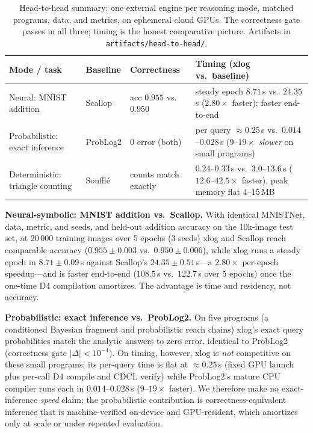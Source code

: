 \begin{table}[htbp]
  \centering
  \caption{Head-to-head summary: one external engine per reasoning mode, matched programs, data, and metrics, on ephemeral cloud GPUs. The correctness gate passes in all three; timing is the honest comparative picture. Artifacts in \texttt{artifacts/head-to-head/}.}
  \label{tab:h2h}
  \small
  \begin{tabularx}{\linewidth}{@{}l l l L@{}}
    \toprule
    \textbf{Mode / task} & \textbf{Baseline} & \textbf{Correctness} & \textbf{Timing (xlog vs.\ baseline)} \\
    \midrule
    Neural: MNIST addition           & Scallop  & acc $0.955$ vs.\ $0.950$ & steady epoch $8.71$\,s vs.\ $24.35$\,s ($\mathbf{2.80\times}$ faster); faster end-to-end \\
    Probabilistic: exact inference   & ProbLog2 & $0$ error (both) & per query ${\approx}0.25$\,s vs.\ $0.014$--$0.028$\,s ($9$--$19\times$ \emph{slower} on small programs) \\
    Deterministic: triangle counting & Soufflé  & counts match exactly & $0.24$--$0.33$\,s vs.\ $3.0$--$13.6$\,s ($\mathbf{12.6}$--$\mathbf{42.5\times}$ faster), peak memory flat $4$--$15$\,MB \\
    \bottomrule
  \end{tabularx}
\end{table}

\textbf{Neural-symbolic: MNIST addition vs.\ Scallop.} With identical MNISTNet, data, metric, and seeds, and held-out addition accuracy on the 10k-image test set, at 20\,000 training images over 5 epochs (3 seeds) xlog and Scallop reach comparable accuracy ($0.955 \pm 0.003$ vs.\ $0.950 \pm 0.006$), while xlog runs a steady epoch in $8.71 \pm 0.09$\,s against Scallop's $24.35 \pm 0.51$\,s---a $2.80\times$ per-epoch speedup---and is faster end-to-end ($108.5$\,s vs.\ $122.7$\,s over 5 epochs) once the one-time D4 compilation amortizes. The advantage is time and residency, not accuracy.

\textbf{Probabilistic: exact inference vs.\ ProbLog2.} On five programs (a conditioned Bayesian fragment and probabilistic reach chains) xlog's exact query probabilities match the analytic answers to zero error, identical to ProbLog2 (correctness gate $|\Delta| < 10^{-4}$). On timing, however, xlog is \emph{not} competitive on these small programs: its per-query time is flat at ${\approx}0.25$\,s (fixed GPU launch plus per-call D4 compile and CDCL verify) while ProbLog2's mature CPU compiler runs each in $0.014$--$0.028$\,s ($9$--$19\times$ faster). We therefore make no exact-inference \emph{speed} claim; the probabilistic contribution is correctness-equivalent inference that is machine-verified on-device and GPU-resident, which amortizes only at scale or under repeated evaluation.

